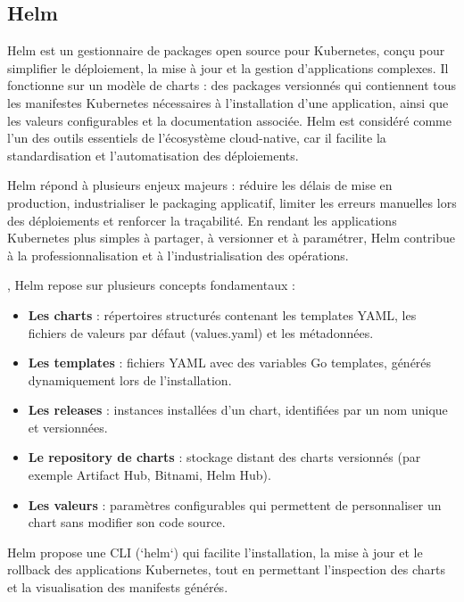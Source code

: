 \subsection{Helm}

Helm est un gestionnaire de packages open source pour Kubernetes, conçu pour simplifier le déploiement, la mise à jour et la gestion d’applications complexes. Il fonctionne sur un modèle de charts  : des packages versionnés qui contiennent tous les manifestes Kubernetes nécessaires à l’installation d’une application, ainsi que les valeurs configurables et la documentation associée. Helm est considéré comme l’un des outils essentiels de l’écosystème cloud-native, car il facilite la standardisation et l’automatisation des déploiements.

 Helm répond à plusieurs enjeux majeurs  : réduire les délais de mise en production, industrialiser le packaging applicatif, limiter les erreurs manuelles lors des déploiements et renforcer la traçabilité. En rendant les applications Kubernetes plus simples à partager, à versionner et à paramétrer, Helm contribue à la professionnalisation et à l’industrialisation des opérations.

, Helm repose sur plusieurs concepts fondamentaux  :
\begin{itemize}
	\item \textbf{Les charts}  : répertoires structurés contenant les templates YAML, les fichiers de valeurs par défaut (values.yaml) et les métadonnées.
	\item \textbf{Les templates}  : fichiers YAML avec des variables Go templates, générés dynamiquement lors de l’installation.
	\item \textbf{Les releases}  : instances installées d’un chart, identifiées par un nom unique et versionnées.
	\item \textbf{Le repository de charts}  : stockage distant des charts versionnés (par exemple Artifact Hub, Bitnami, Helm Hub).
	\item \textbf{Les valeurs}  : paramètres configurables qui permettent de personnaliser un chart sans modifier son code source.
\end{itemize}

Helm propose une CLI (`helm`) qui facilite l’installation, la mise à jour et le rollback des applications Kubernetes, tout en permettant l’inspection des charts et la visualisation des manifests générés.

